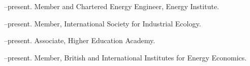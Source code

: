 \documentclass[11pt,a4paper]{article}
\begin{document}
\noindent{}%

\bigskip

\noindent{}%

\bigskip 

\noindent{}%

\bigskip

\newpage
\noindent{}%

\bigskip

\noindent{}%

\bigskip

\noindent{}%
%
--present.  Member and Chartered Energy Engineer, Energy Institute.

--present.  Member, International Society for Industrial Ecology.

--present.  Associate, Higher Education Academy.

--present.  Member, British and International Institutes for Energy Economics.
\end{document}
